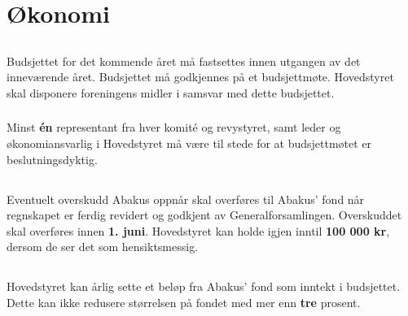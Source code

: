 \section{Økonomi}
\subsection{}
Budsjettet for det kommende året må fastsettes innen utgangen av det inneværende året. 
Budsjettet må godkjennes på et budsjettmøte. Hovedstyret skal disponere foreningens midler i samsvar med dette budsjettet.

\subsubsection{}
Minst \textbf{én} representant fra hver komité og revystyret, samt leder og økonomiansvarlig i 
Hovedstyret må være til stede for at budsjettmøtet er beslutningsdyktig.

\subsection{}
Eventuelt overskudd Abakus oppnår skal overføres til Abakus’ fond når regnskapet er ferdig revidert og 
godkjent av Generalforsamlingen. Overskuddet skal overføres innen \textbf{1. juni}. 
Hovedstyret kan holde igjen inntil \textbf{100 000 kr}, dersom de ser det som hensiktsmessig.

\subsection{}
Hovedstyret kan årlig sette et beløp fra Abakus’ fond som inntekt i budsjettet. Dette kan ikke 
redusere størrelsen på fondet med mer enn \textbf{tre} prosent.
